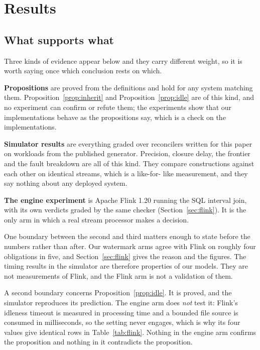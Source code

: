 \documentclass[10pt,conference]{IEEEtran}
\begin{document}
\section{Results}

\subsection{What supports what}
\label{sec:evidence}

Three kinds of evidence appear below and they carry different weight, so it is
worth saying once which conclusion rests on which.

\textbf{Propositions} are proved from the definitions and hold for any system
matching them. Proposition~\ref{prop:inherit} and Proposition~\ref{prop:idle}
are of this kind, and no experiment can confirm or refute them; the
experiments show that our implementations behave as the propositions say,
which is a check on the implementations.

\textbf{Simulator results} are everything graded over reconcilers written for
this paper on workloads from the published generator. Precision, closure
delay, the frontier and the fault breakdown are all of this kind. They compare
constructions against each other on identical streams, which is a like-for-
like measurement, and they say nothing about any deployed system.

\textbf{The engine experiment} is Apache Flink 1.20 running the SQL interval
join, with its own verdicts graded by the same checker
(Section~\ref{sec:flink}). It is the only arm in which a real stream processor
makes a decision.

One boundary between the second and third matters enough to state before the
numbers rather than after. Our watermark arms agree with Flink on roughly four
obligations in five, and Section~\ref{sec:flink} gives the reason and the
figures. The timing results in the simulator are therefore properties of our
models. They are not measurements of Flink, and the Flink arm is not a
validation of them.

A second boundary concerns Proposition~\ref{prop:idle}. It is proved, and the
simulator reproduces its prediction. The engine arm does \emph{not} test it:
Flink's idleness timeout is measured in processing time and a bounded file
source is consumed in milliseconds, so the setting never engages, which is why
its four values give identical rows in Table~\ref{tab:flink}. Nothing in the
engine arm confirms the proposition and nothing in it contradicts the
proposition.
\end{document}
